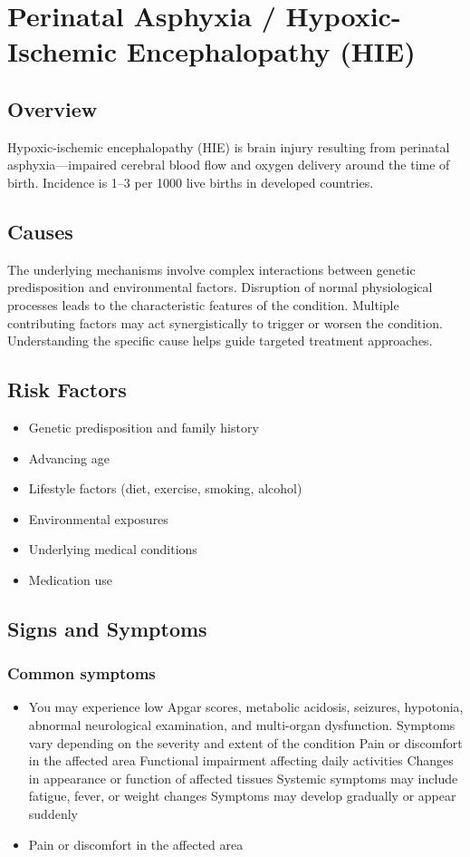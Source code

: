 \chapter{Perinatal Asphyxia / Hypoxic-Ischemic Encephalopathy (HIE)}
\label{sec:Hypoxic-Ischemic Encephalopathy}

\section{Overview}
Hypoxic-ischemic encephalopathy (HIE) is brain injury resulting from perinatal asphyxia---impaired cerebral blood flow and oxygen delivery around the time of birth. Incidence is 1--3 per 1000 live births in developed countries.
\section{Causes}
The underlying mechanisms involve complex interactions between genetic predisposition and environmental factors. Disruption of normal physiological processes leads to the characteristic features of the condition. Multiple contributing factors may act synergistically to trigger or worsen the condition. Understanding the specific cause helps guide targeted treatment approaches.
\section{Risk Factors}


\begin{itemize}[noitemsep]
  \item Genetic predisposition and family history
  \item Advancing age
  \item Lifestyle factors (diet, exercise, smoking, alcohol)
  \item Environmental exposures
  \item Underlying medical conditions
  \item Medication use
\end{itemize}
\section{Signs and Symptoms}

\subsection{Common symptoms}
\begin{itemize}[noitemsep]
  \item You may experience low Apgar scores, metabolic acidosis, seizures, hypotonia, abnormal neurological examination, and multi-organ dysfunction. Symptoms vary depending on the severity and extent of the condition Pain or discomfort in the affected area Functional impairment affecting daily activities Changes in appearance or function of affected tissues Systemic symptoms may include fatigue, fever, or weight changes Symptoms may develop gradually or appear suddenly
  \item Pain or discomfort in the affected area
  \end{itemize}

